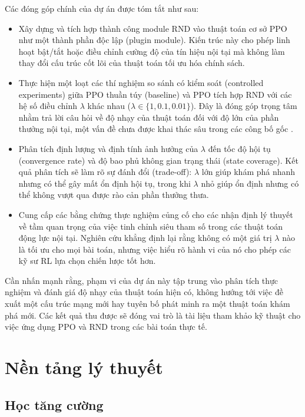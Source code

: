 \documentclass{uetgraduation}
\begin{document}
Các đóng góp chính của dự án được tóm tắt như sau:
\begin{itemize}
    \item Xây dựng và tích hợp thành công module RND vào thuật toán cơ sở PPO như một thành phần độc lập (plugin module). Kiến trúc này cho phép linh hoạt bật/tắt hoặc điều chỉnh cường độ của tín hiệu nội tại mà không làm thay đổi cấu trúc cốt lõi của thuật toán tối ưu hóa chính sách.
    
    \item Thực hiện một loạt các thí nghiệm so sánh có kiểm soát (controlled experiments) giữa PPO thuần túy (baseline) và PPO tích hợp RND với các hệ số điều chỉnh $\lambda$ khác nhau ($\lambda \in \{1, 0.1, 0.01\}$). Đây là đóng góp trọng tâm nhằm trả lời câu hỏi về độ nhạy của thuật toán đối với độ lớn của phần thưởng nội tại, một vấn đề chưa được khai thác sâu trong các công bố gốc \cite{burda2019}.
    
    \item Phân tích định lượng và định tính ảnh hưởng của $\lambda$ đến tốc độ hội tụ (convergence rate) và độ bao phủ không gian trạng thái (state coverage). Kết quả phân tích sẽ làm rõ sự đánh đổi (trade-off): $\lambda$ lớn giúp khám phá nhanh nhưng có thể gây mất ổn định hội tụ, trong khi $\lambda$ nhỏ giúp ổn định nhưng có thể không vượt qua được rào cản phần thưởng thưa.
    
    \item Cung cấp các bằng chứng thực nghiệm củng cố cho các nhận định lý thuyết \cite{andres2022} về tầm quan trọng của việc tinh chỉnh siêu tham số trong các thuật toán động lực nội tại. Nghiên cứu khẳng định lại rằng không có một giá trị $\lambda$ nào là tối ưu cho mọi bài toán, nhưng việc hiểu rõ hành vi của nó cho phép các kỹ sư RL lựa chọn chiến lược tốt hơn.
\end{itemize}

Cần nhấn mạnh rằng, phạm vi của dự án này tập trung vào phân tích thực nghiệm và đánh giá độ nhạy của thuật toán hiện có, không hướng tới việc đề xuất một cấu trúc mạng mới hay tuyên bố phát minh ra một thuật toán khám phá mới. Các kết quả thu được sẽ đóng vai trò là tài liệu tham khảo kỹ thuật cho việc ứng dụng PPO và RND trong các bài toán thực tế.

\chapter{Nền tảng lý thuyết}\label{sec:rl-theory}

\section{Học tăng cường}
\end{document}
